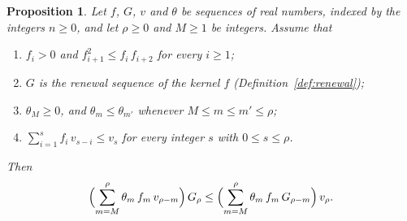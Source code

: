 \documentclass{amsart}
\newtheorem{proposition}[theorem]{Proposition}
\theoremstyle{definition}
\theoremstyle{remark}
\numberwithin{equation}{section}
\begin{document}
\begin{proposition}\label{prop:extremecolumn}
Let $f$, $G$, $v$ and $\theta$ be sequences of real numbers, indexed by the integers $n\ge 0$, and let $\rho\ge 0$ and $M\ge 1$ be integers. Assume that
\begin{enumerate}
\item $f_i>0$ and $f_{i+1}^2\le f_i\,f_{i+2}$ for every $i\ge 1$;
\item $G$ is the renewal sequence of the kernel $f$ (Definition~\ref{def:renewal});
\item $\theta_M\ge 0$, and $\theta_m\le\theta_{m'}$ whenever $M\le m\le m'\le\rho$;
\item $\sum_{i=1}^{s}f_i\,v_{s-i}\le v_s$ for every integer $s$ with $0\le s\le\rho$.
\end{enumerate}
Then
\[
\Bigl(\sum_{m=M}^{\rho}\theta_m\,f_m\,v_{\rho-m}\Bigr)\,G_\rho\le\Bigl(\sum_{m=M}^{\rho}\theta_m\,f_m\,G_{\rho-m}\Bigr)\,v_\rho .
\]
\end{proposition}
\end{document}
